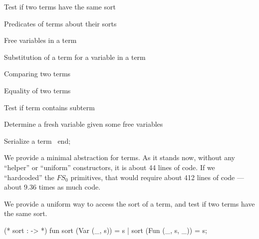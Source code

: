 \LA{}Test if two terms have the same sort~{\nwtagstyle{}}\RA{}

\LA{}Predicates of terms about their sorts~{\nwtagstyle{}}\RA{}

\LA{}Free variables in a term~{\nwtagstyle{}}\RA{}

\LA{}Substitution of a term for a variable in a term~{\nwtagstyle{}}\RA{}

\LA{}Comparing two terms~{\nwtagstyle{}}\RA{}

\LA{}Equality of two terms~{\nwtagstyle{}}\RA{}

\LA{}Test if term contains subterm~{\nwtagstyle{}}\RA{}

\LA{}Determine a fresh variable given some free variables~{\nwtagstyle{}}\RA{}

\LA{}Serialize a term~{\nwtagstyle{}}\RA{}
end;
\eatline
{}\nwendcode{}\nwdocspar
\begin{node}
We provide a minimal abstraction for terms. As it stands now, without
any ``helper'' or ``uniform'' constructors, it is about 44 lines of
code. If we ``hardcoded'' the $FS_{0}$ primitives, that would require
about 412 lines of code --- about $9.36$ times as much code.
\end{node}

\begin{node}
We provide a uniform way to access the sort of a term, and test if two
terms have the same sort.
\end{node}

\nwenddocs{}\endmoddef\nwstartdeflinemarkup{}\nwenddeflinemarkup
(* sort :  ->  *)
fun sort (Var (_, s)) = s
  | sort (Fun (_, s, _)) = s;


